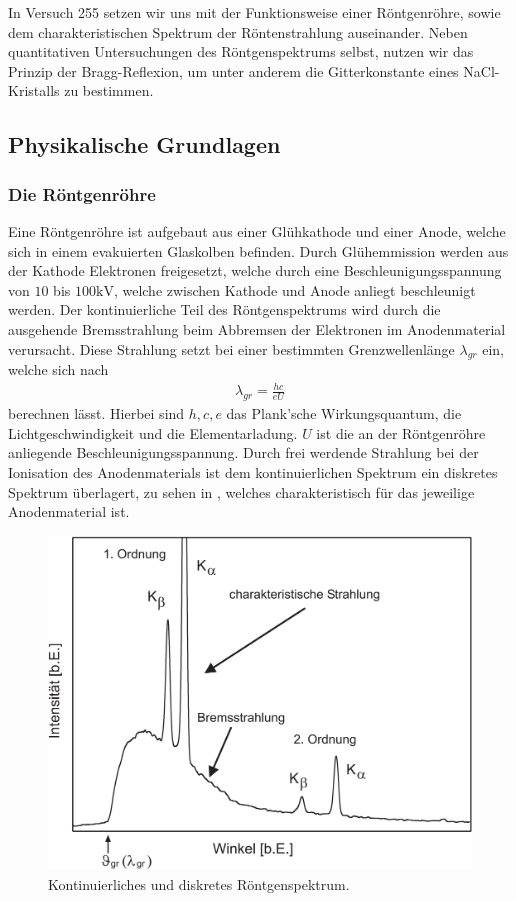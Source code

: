 In Versuch 255 setzen wir uns mit der Funktionsweise einer Röntgenröhre, sowie dem charakteristischen Spektrum der Röntenstrahlung auseinander. Neben quantitativen Untersuchungen des Röntgenspektrums selbst, nutzen wir das Prinzip der Bragg-Reflexion, um unter anderem die Gitterkonstante eines NaCl-Kristalls zu bestimmen.

\subsection{Physikalische Grundlagen}

\subsubsection*{Die Röntgenröhre}
Eine Röntgenröhre ist aufgebaut aus einer Glühkathode und einer Anode, welche sich in einem evakuierten Glaskolben befinden. Durch Glühemmission werden aus der Kathode Elektronen freigesetzt, welche durch eine Beschleunigungsspannung von $10$ bis $100\si{\kilo\volt}$, welche zwischen Kathode und Anode anliegt beschleunigt werden. Der kontinuierliche Teil des Röntgenspektrums wird durch die ausgehende Bremsstrahlung beim Abbremsen der Elektronen im Anodenmaterial verursacht. Diese Strahlung setzt bei einer bestimmten Grenzwellenlänge $\lambda_{gr}$ ein, welche sich nach
\begin{align}
  \lambda_{gr} = \frac{hc}{eU}
\end{align}
berechnen lässt. Hierbei sind $h,c,e$ das Plank'sche Wirkungsquantum, die Lichtgeschwindigkeit und die Elementarladung. $U$ ist die an der Röntgenröhre anliegende Beschleunigungsspannung. Durch frei werdende Strahlung bei der Ionisation des Anodenmaterials ist dem kontinuierlichen Spektrum ein diskretes Spektrum überlagert, zu sehen in , welches charakteristisch für das jeweilige Anodenmaterial ist. 

\begin{figure}[H]
  \centering
  \includegraphics[width=.75\textwidth]{files/roentgenspektrum.png}
  \caption{Kontinuierliches und diskretes Röntgenspektrum.}
  \label{fig:roentgenspektrum}
\end{figure}

